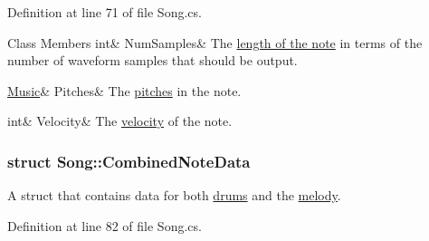 Definition at line 71 of file Song.\+cs.

\begin{DoxyFields}{Class Members}
\mbox{\label{group___song_structs_a3281b43fa098f3ecb6c3e89581eafc46}} 
int&
NumSamples&
The \hyperlink{group___music_structs_ac35cd02f5b3c00e3040b51e40e9e6c94}{length of the note} in terms of the number of waveform samples that should be output. \\
\hline

\mbox{\label{group___song_structs_acae800be2929ee4b0ec6a56f3b461f43}} 
\hyperlink{class_music}{Music}&
Pitches&
The \hyperlink{group___music_structs_aab23b49ea9d7961aef5091154ce45946}{pitches} in the note. \\
\hline

\mbox{\label{group___song_structs_ad803d70e058e26220191fccca7f0867c}} 
int&
Velocity&
The \hyperlink{group___audio_DefVel}{velocity} of the note. \\
\hline

\end{DoxyFields}
\label{struct_song_1_1_combined_note_data}
\subsubsection{struct Song\+:\+:Combined\+Note\+Data}
A struct that contains data for both \hyperlink{group___music_structs_struct_music_1_1_percussion_note}{drums} and the \hyperlink{group___music_structs_struct_music_1_1_melody_note}{melody}. 

Definition at line 82 of file Song.\+cs.

